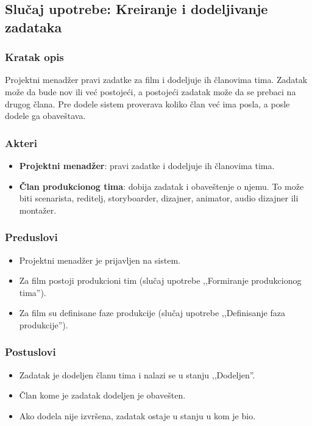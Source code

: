 \subsection{Slučaj upotrebe: Kreiranje i dodeljivanje zadataka}

\subsubsection*{Kratak opis}

Projektni menadžer pravi zadatke za film i dodeljuje ih članovima tima. Zadatak može da bude nov ili već postojeći, a postojeći zadatak može da se prebaci na drugog člana. Pre dodele sistem proverava koliko član već ima posla, a posle dodele ga obaveštava.

\subsubsection*{Akteri}
\begin{itemize}
    \item \textbf{Projektni menadžer}: pravi zadatke i dodeljuje ih članovima tima.
    \item \textbf{Član produkcionog tima}: dobija zadatak i obaveštenje o njemu. To može biti scenarista, reditelj, storyboarder, dizajner, animator, audio dizajner ili montažer.
\end{itemize}

\subsubsection*{Preduslovi}
\begin{itemize}
    \item Projektni menadžer je prijavljen na sistem.
    \item Za film postoji produkcioni tim (slučaj upotrebe ,,Formiranje produkcionog tima'').
    \item Za film su definisane faze produkcije (slučaj upotrebe ,,Definisanje faza produkcije'').
\end{itemize}

\subsubsection*{Postuslovi}
\begin{itemize}
    \item Zadatak je dodeljen članu tima i nalazi se u stanju ,,Dodeljen''.
    \item Član kome je zadatak dodeljen je obavešten.
    \item Ako dodela nije izvršena, zadatak ostaje u stanju u kom je bio.
\end{itemize}

